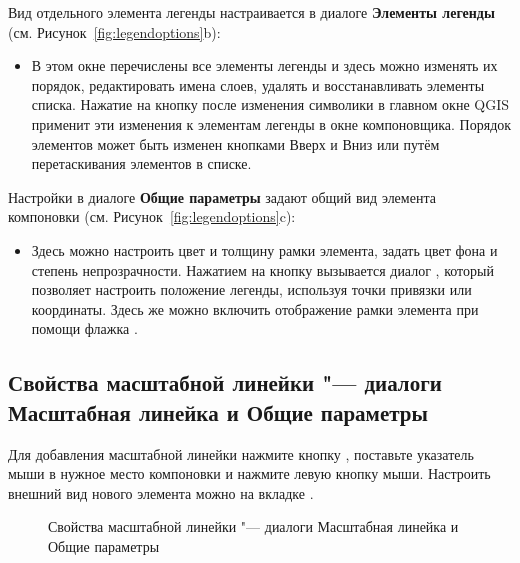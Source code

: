 
Вид отдельного элемента легенды настраивается в диалоге
\textbf{Элементы легенды} (см. Рисунок~\ref{fig:legendoptions}b):

\begin{itemize}[label=--]
\item В этом окне перечислены все элементы легенды и здесь можно
изменять их порядок, редактировать имена слоев, удалять и восстанавливать
элементы списка. Нажатие на кнопку  после изменения
символики в главном окне QGIS применит эти изменения к элементам
легенды в окне компоновщика. Порядок элементов может быть изменен
кнопками Вверх и Вниз или путём перетаскивания элементов в списке.
\end{itemize}


Настройки в диалоге \textbf{Общие параметры} задают общий вид
элемента компоновки (см. Рисунок~\ref{fig:legendoptions}c):

\begin{itemize}[label=--]
\item Здесь можно настроить цвет и толщину рамки элемента, задать
цвет фона и степень непрозрачности. Нажатием на кнопку
 вызывается диалог ,
который позволяет настроить положение легенды, используя точки привязки
или координаты. Здесь же можно включить отображение рамки элемента при
помощи флажка .
\end{itemize}

\subsection{Свойства масштабной линейки "--- диалоги Масштабная линейка и Общие параметры}

Для добавления масштабной линейки нажмите кнопку
, поставьте указатель
мыши в нужное место компоновки и нажмите левую кнопку мыши. Настроить
внешний вид нового элемента можно на вкладке .

\begin{figure}[ht]
\centering
{}
\hspace{1cm}
\caption{Свойства масштабной линейки "--- диалоги Масштабная линейка и Общие параметры \wincaption}\label{fig:scalebaroptions}
\end{figure}

